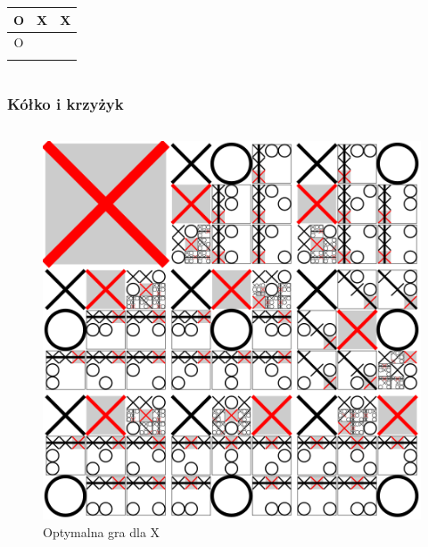 \documentclass[polish,envcountsect,10pt]{beamer}
\begin{document}
\begin{frame}
\begin{columns}
{\begin{table}
                                \begin{tabular}{| c | c | c |}
                                    \hline O & X & X \\
                                    \hline O &  &   \\
                                    \hline   &   &   \\
                                    \hline
                                \end{tabular}
                            \end{table}
                            }
                    \end{columns}
                \end{frame}
                \begin{frame}
                    \frametitle{Kółko i krzyżyk}
                    \begin{columns}
                        \begin{figure}[H]
                            \centering
                            \includegraphics[width=\textwidth,natwidth=480,natheight=480]{images/480px-Tictactoe-X.svg.png}
                            \caption{Optymalna gra dla X}
                        \end{figure}

\end{columns}
\end{frame}
\end{document}
